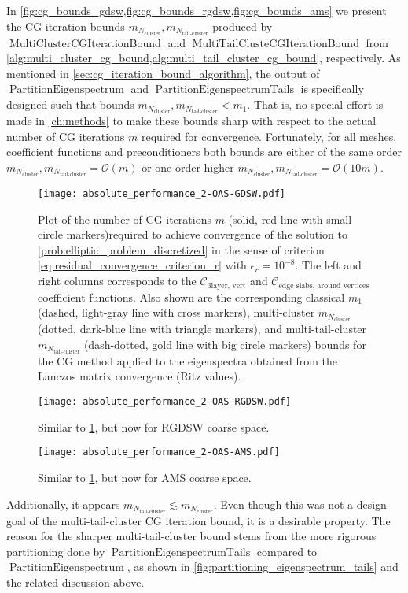 In \cref{fig:cg_bounds_gdsw,fig:cg_bounds_rgdsw,fig:cg_bounds_ams} we present the CG iteration bounds $m_{N_{\text{cluster}}}, m_{N_{\text{tail-cluster}}}$ produced by \newline$\operatorname{MultiClusterCGIterationBound}$ and $\operatorname{MultiTailClusteCGIterationBound}$ from \cref{alg:multi_cluster_cg_bound,alg:multi_tail_cluster_cg_bound}, respectively. As mentioned in \cref{sec:cg_iteration_bound_algorithm}, the output of $\operatorname{PartitionEigenspectrum}$ and \newline$\operatorname{PartitionEigenspectrumTails}$ is specifically designed such that bounds $m_{N_{\text{cluster}}}, m_{N_{\text{tail-cluster}}} < m_1$. That is, no special effort is made in \cref{ch:methods} to make these bounds sharp with respect to the actual number of CG iterations $m$ required for convergence. Fortunately, for all meshes, coefficient functions and preconditioners both bounds are either of the same order $m_{N_{\text{cluster}}}, m_{N_{\text{tail-cluster}}} = \mathcal{O}(m)$ or one order higher $m_{N_{\text{cluster}}}, m_{N_{\text{tail-cluster}}} = \mathcal{O}(10m)$.
\begin{figure}[H]
    \centering
    \texttt{[image: absolute\_performance\_2-OAS-GDSW.pdf]}
    \caption{Plot of the number of CG iterations $m$ (solid, red line with small circle markers)required to achieve convergence of the solution to \cref{prob:elliptic_problem_discretized} in the sense of criterion \cref{eq:residual_convergence_criterion_r} with $\epsilon_r=10^{-8}$. The left and right columns corresponds to the $\mathcal{C}_{\text{3layer, vert}}$ and $\mathcal{C}_{\text{edge slabs, around vertices}}$ coefficient functions. Also shown are the corresponding classical $m_1$ (dashed, light-gray line with cross markers), multi-cluster $m_{N_{\text{cluster}}}$ (dotted, dark-blue line with triangle markers), and multi-tail-cluster $m_{N_{\text{tail-cluster}}}$ (dash-dotted, gold line with big circle markers) bounds for the CG method applied to the eigenspectra obtained from the Lanczos matrix convergence (Ritz values).}
    \label{fig:cg_bounds_gdsw}
\end{figure}
\begin{figure}[H]
    \centering\texttt{[image: absolute\_performance\_2-OAS-RGDSW.pdf]}
    \caption{Similar to \cref{fig:cg_bounds_gdsw}, but now for RGDSW coarse space.}
    \label{fig:cg_bounds_rgdsw}
\end{figure}
\begin{figure}[H]
    \centering\texttt{[image: absolute\_performance\_2-OAS-AMS.pdf]}
    \caption{Similar to \cref{fig:cg_bounds_gdsw}, but now for AMS coarse space.}
    \label{fig:cg_bounds_ams}
\end{figure}
Additionally, it appears $m_{N_{\text{tail-cluster}}} \lesssim m_{N_{\text{cluster}}}$. Even though this was not a design goal of the multi-tail-cluster CG iteration bound, it is a desirable property. The reason for the sharper multi-tail-cluster bound stems from the more rigorous partitioning done by $\operatorname{PartitionEigenspectrumTails}$ compared to $\operatorname{PartitionEigenspectrum}$, as shown in \cref{fig:partitioning_eigenspectrum_tails} and the related discussion above.

